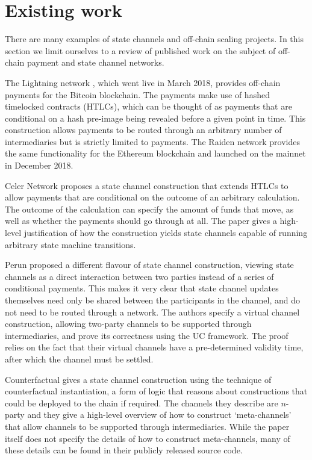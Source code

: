 \section{Existing work}

There are many examples of state channels and off-chain scaling projects. In this section we limit ourselves to a review of published work on the subject of off-chain payment and state channel networks.

The Lightning network \cite{lightning}, which went live in March 2018, provides off-chain payments for the Bitcoin blockchain.
The payments make use of hashed timelocked contracts (HTLCs), which can be thought of as payments that are conditional on a hash pre-image being revealed before a given point in time.
This construction allows payments to be routed through an arbitrary number of intermediaries but is strictly limited to payments.
The Raiden network \cite{raiden} provides the same functionality for the Ethereum blockchain and launched on the mainnet in December 2018.

Celer Network \cite{celer} proposes a state channel construction that extends HTLCs to allow payments that are conditional on the outcome of an arbitrary calculation.
The outcome of the calculation can specify the amount of funds that move, as well as whether the payments should go through at all.
The paper gives a high-level justification of how the construction yields state channels capable of running arbitrary state machine transitions.

Perun \cite{perun1, perun2} proposed a different flavour of state channel construction, viewing state channels as a direct interaction between two parties instead of a series of conditional payments.
This makes it very clear that state channel updates themselves need only be shared between the participants in the channel, and do not need to be routed through a network.
The authors specify a virtual channel construction, allowing two-party channels to be supported through intermediaries, and prove its correctness using the UC framework.
The proof relies on the fact that their virtual channels have a pre-determined validity time, after which the channel must be settled.

Counterfactual \cite{counterfactual} gives a state channel construction using the technique of counterfactual instantiation, a form of logic that reasons about constructions that could be deployed to the chain if required.
The channels they describe are $n$-party and they give a high-level overview of how to construct `meta-channels' that allow channels to be supported through intermediaries.
While the paper itself does not specify the details of how to construct meta-channels, many of these details can be found in their publicly released source code.
